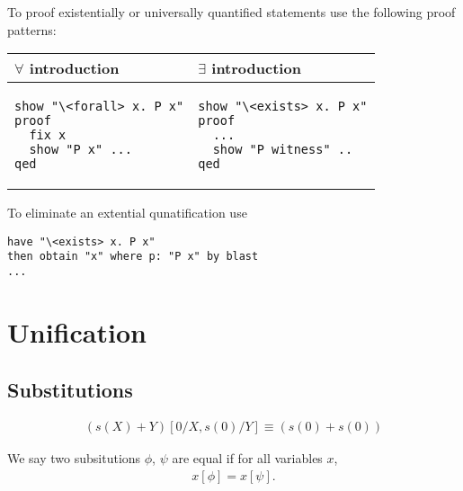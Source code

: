 \documentclass{article}
\begin{document}
\begin{definition}
	To proof existentially or universally quantified statements
	use the following proof patterns:\par
	\begin{center}
		\begin{tabular}{l | l}
			\textbf{$\forall$ introduction} &
			\textbf{$\exists$ introduction}   \\
			\hline
			\begin{minipage}[t]{0.4\textwidth}
				\begin{verbatim}
show "\<forall> x. P x"
proof
  fix x 
  show "P x" ...
qed
				\end{verbatim}
			\end{minipage}      &
			\begin{minipage}[t]{0.4\textwidth}
				\begin{verbatim}
show "\<exists> x. P x"
proof
  ...
  show "P witness" ..
qed
				\end{verbatim}
			\end{minipage}
		\end{tabular}
	\end{center}
\end{definition}

\begin{definition}
	To eliminate an extential qunatification use
	\begin{verbatim}
have "\<exists> x. P x"
then obtain "x" where p: "P x" by blast
...	
	\end{verbatim}
\end{definition}

\section{Unification}

\subsection{Substitutions}

\begin{example}
	\begin{align*}
		(s(X)+Y)[0/X,s(0)/Y]\equiv (s(0)+s(0))
	\end{align*}
\end{example}

\begin{definition}
	We say two subsitutions $\phi$, $\psi$ are equal if for all variables $x$,
	\begin{align*}
		x[\phi] = x[\psi].
	\end{align*}
\end{definition}
\end{document}
